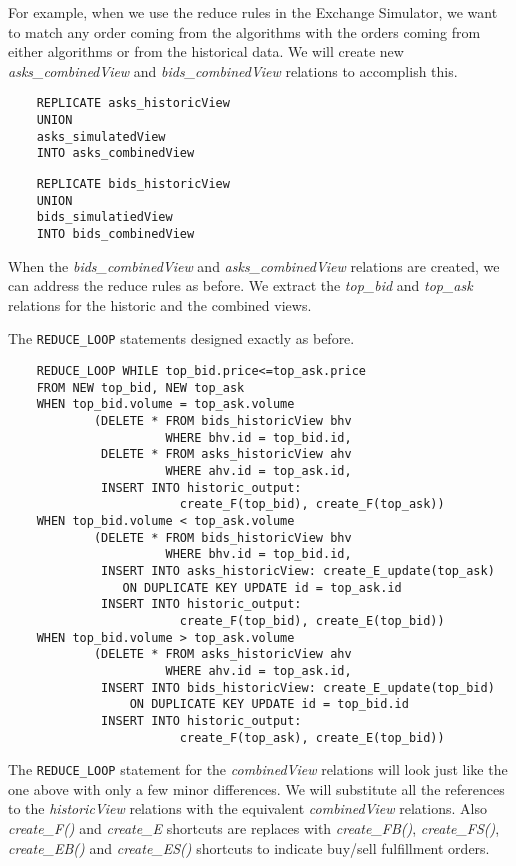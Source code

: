 \documentclass{article}
\begin{document}
For example, when we use the reduce rules in the Exchange Simulator, we want to match any order coming from the algorithms with the orders coming from either algorithms or from the historical data. We will create new \emph{asks\_combinedView} and \emph{bids\_combinedView} relations to accomplish this.

\begin{verbatim}
    REPLICATE asks_historicView
    UNION
    asks_simulatedView
    INTO asks_combinedView
\end{verbatim}

\begin{verbatim}
    REPLICATE bids_historicView
    UNION
    bids_simulatiedView
    INTO bids_combinedView
\end{verbatim}

When the \emph{bids\_combinedView} and \emph{asks\_combinedView} relations are created, we can address the reduce rules as before. We extract the \emph{top\_bid} and \emph{top\_ask} relations for the historic and the combined views.

The {\tt REDUCE\_LOOP} statements designed exactly as before.

\begin{verbatim}  
    REDUCE_LOOP WHILE top_bid.price<=top_ask.price
    FROM NEW top_bid, NEW top_ask
    WHEN top_bid.volume = top_ask.volume 
            (DELETE * FROM bids_historicView bhv 
                      WHERE bhv.id = top_bid.id,
             DELETE * FROM asks_historicView ahv 
                      WHERE ahv.id = top_ask.id,
             INSERT INTO historic_output: 
                        create_F(top_bid), create_F(top_ask))
    WHEN top_bid.volume < top_ask.volume 
            (DELETE * FROM bids_historicView bhv 
                      WHERE bhv.id = top_bid.id,
             INSERT INTO asks_historicView: create_E_update(top_ask) 
                ON DUPLICATE KEY UPDATE id = top_ask.id
             INSERT INTO historic_output:
                        create_F(top_bid), create_E(top_bid))
    WHEN top_bid.volume > top_ask.volume 
            (DELETE * FROM asks_historicView ahv 
                      WHERE ahv.id = top_ask.id,
             INSERT INTO bids_historicView: create_E_update(top_bid) 
                 ON DUPLICATE KEY UPDATE id = top_bid.id
             INSERT INTO historic_output:
                        create_F(top_ask), create_E(top_bid))
\end{verbatim}

The {\tt REDUCE\_LOOP} statement for the \emph{combinedView} relations will look just like the one above with only a few minor differences. We will substitute all the references to the \emph{historicView} relations with the equivalent \emph{combinedView} relations. Also \emph{create\_F()} and \emph{create\_E} shortcuts are replaces with \emph{create\_FB()}, \emph{create\_FS()}, \emph{create\_EB()} and \emph{create\_ES()} shortcuts to indicate buy/sell fulfillment orders.
\end{document}
